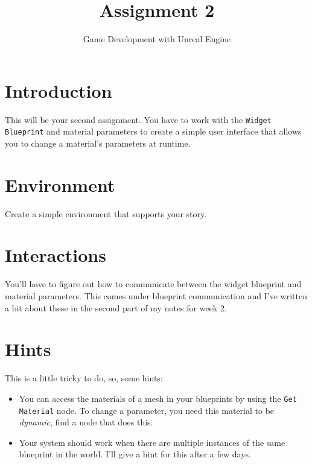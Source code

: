 \documentclass{article}
\title{Assignment 2}
\author{Game Development with Unreal Engine}
\date{}
\begin{document}
\maketitle

\section*{Introduction}
This will be your second assignment. You have to work with the \verb|Widget Blueprint| and material parameters to create a simple user interface that allows you to change a material's parameters at runtime.

\section*{Environment}
Create a simple environment that supports your story. 

\section*{Interactions}
You'll have to figure out how to communicate between the widget blueprint and material parameters. This comes under blueprint communication and I've written a bit about these in the second part of my notes for week 2.

\section*{Hints}
This is a little tricky to do, so, some hints:
\begin{itemize}
    \item You can access the materials of a mesh in your blueprints by using the \verb|Get Material| node. To change a parameter, you need this material to be \emph{dynamic}, find a node that does this.
    \item Your system should work when there are multiple instances of the same blueprint in the world. I'll give a hint for this after a few days.
\end{itemize}
\end{document}
